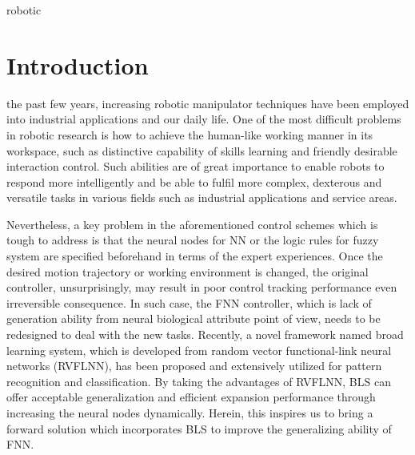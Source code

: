 \documentclass[journal]{IEEEtran}
\begin{document}
\begin{IEEEkeywords}
    robotic
\end{IEEEkeywords}

\section{Introduction}
 the past few years, increasing robotic manipulator techniques have been employed into industrial applications and our daily life. One of the most difficult problems in robotic research is how to achieve the human-like working manner in its workspace, such as distinctive capability of skills learning and friendly desirable interaction control. Such abilities are of great importance to enable robots to respond more intelligently and be able to fulfil more complex, dexterous and versatile tasks in various fields such as industrial applications and service areas. 

Nevertheless, a key problem in the aforementioned control schemes which is tough to address is that the neural nodes for NN or the logic rules for fuzzy system are specified beforehand in terms of the expert experiences. Once the desired motion trajectory or working environment is changed, the original controller, unsurprisingly, may result in poor control tracking performance even irreversible consequence. In such case, the FNN controller, which is lack of generation ability from neural biological attribute point of view, needs to be redesigned to deal with the new tasks. Recently, a novel framework named broad learning system, which is developed from random vector functional-link neural networks (RVFLNN), has been proposed and extensively utilized for pattern recognition and classification. By taking the advantages of RVFLNN, BLS can offer acceptable generalization and efficient expansion performance through increasing the neural nodes dynamically. Herein, this inspires us to bring a forward solution which incorporates BLS to improve the generalizing ability of FNN.
\end{document}

